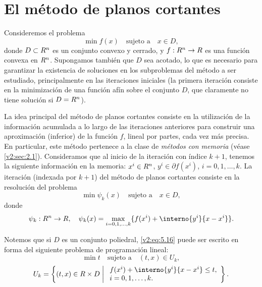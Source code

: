 
\section{El método de planos cortantes}
\label{v2:sec:5.2}

Consideremos el problema
\begin{equation}
    \min f(x) \quad \text{sujeto a} \quad x \in D,
    \label{v2:eq:5.15}
\end{equation}
donde $D \subset R^n$ es un conjunto convexo y cerrado, y $f : R^n \to R$ es una función convexa en $R^n$. Supongamos también que $D$ sea acotado, lo que es necesario para garantizar la existencia de soluciones en los subproblemas del método a ser estudiado, principalmente en las iteraciones iniciales (la primera iteración consiste en la minimización de una función afín sobre el conjunto $D$, que claramente no tiene solución si $D = R^n$).

La idea principal del método de planos cortantes consiste en la utilización de la información acumulada a lo largo de las iteraciones anteriores para construir una aproximación (inferior) de la función $f$, lineal por partes, cada vez más precisa. En particular, este método pertenece a la clase de \textit{métodos con memoria} (véase \cref{v2:sec:2.1}). Consideramos que al inicio de la iteración con índice $k+1$, tenemos la siguiente información en la memoria: $x^i \in R^n$, $y^i \in \partial f(x^i)$, $i = 0, 1, \dots, k$. La iteración (indexada por $k+1$) del método de planos cortantes consiste en la resolución del problema
\begin{equation}
    \min \psi_k(x) \quad \text{sujeto a} \quad x \in D,
    \label{v2:eq:5.16}
\end{equation}
donde
\begin{equation}
    \psi_k : \Rn \to \R, \quad \psi_k(x) = \max_{i=0, 1, \dots, k} \{ f(x^i) + \interno{y^i}{x - x^i} \}.
    \label{v2:eq:5.17}
\end{equation}

Notemos que si $D$ es un conjunto poliedral, \eqref{v2:eq:5.16} puede ser escrito en forma del siguiente problema de programación lineal:
\begin{equation}
    \min t \quad \text{sujeto a} \quad (t, x) \in U_k,
    \label{v2:eq:5.18}
\end{equation}
\begin{equation}
    U_k = \left\{ (t, x) \in \R \times D \;\middle|\; \begin{array}{l} f(x^i) + \interno{y^i}{x - x^i} \le t, \\ i = 0, 1, \dots, k. \end{array} \right\}.
    \label{v2:eq:5.19}
\end{equation}

